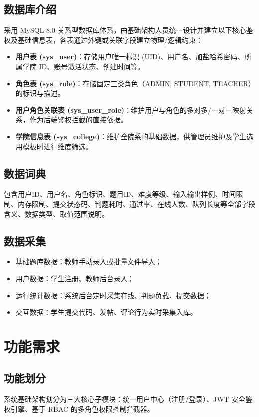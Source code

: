 \documentclass{../template/softeng}
\begin{document}
\subsection{数据库介绍}
采用 MySQL 8.0 关系型数据库体系，由基础架构人员统一设计并建立以下核心鉴权及基础信息表，各表通过外键或关联字段建立物理/逻辑约束：
\begin{itemize}
    \item \textbf{用户表 (sys\_user)}：存储用户唯一标识 (UID)、用户名、加盐哈希密码、所属学院 ID、账号激活状态、创建时间等。
    \item \textbf{角色表 (sys\_role)}：存储固定三类角色（ADMIN, STUDENT, TEACHER）的标识与描述。
    \item \textbf{用户角色关联表 (sys\_user\_role)}：维护用户与角色的多对多/一对一映射关系，作为后端鉴权拦截的直接依据。
    \item \textbf{学院信息表 (sys\_college)}：维护全院系的基础数据，供管理员维护及学生选用模板时进行维度筛选。
\end{itemize}
\subsection{数据词典}
包含用户ID、用户名、角色标识、题目ID、难度等级、输入输出样例、时间限制、内存限制、提交状态码、判题耗时、通过率、在线人数、队列长度等全部字段含义、数据类型、取值范围说明。

\subsection{数据采集}
\begin{itemize}
    \item 基础题库数据：教师手动录入或批量文件导入；
    \item 用户数据：学生注册、教师后台录入；
    \item 运行统计数据：系统后台定时采集在线、判题负载、提交数据；
    \item 交互数据：学生提交代码、发帖、评论行为实时采集入库。
\end{itemize}

\section{功能需求}
\subsection{功能划分}
系统基础架构划分为三大核心子模块：统一用户中心（注册/登录）、JWT 安全鉴权引擎、基于 RBAC 的多角色权限控制拦截器。
\end{document}
